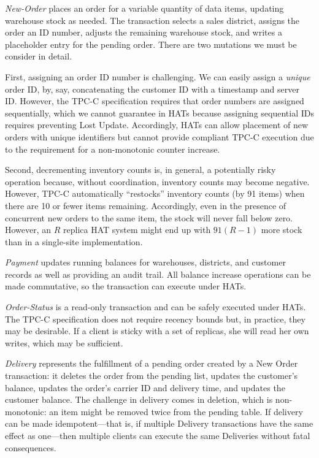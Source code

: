 \vspace{.5em}\noindent\textit{New-Order} places an order for a
variable quantity of data items, updating warehouse stock as
needed. The transaction selects a sales district, assigns the order an
ID number, adjusts the remaining warehouse stock, and writes a
placeholder entry for the pending order. There are two mutations we
must be consider in detail.

First, assigning an order ID number is challenging. We can easily
assign a \textit{unique} order ID, by, say, concatenating the customer
ID with a timestamp and server ID. However, the TPC-C specification
requires that order numbers are assigned sequentially, which we cannot
guarantee in HATs because assigning sequential IDs requires preventing
Lost Update. Accordingly, HATs can allow placement of new orders with
unique identifiers but cannot provide compliant TPC-C execution due to
the requirement for a non-monotonic counter increase.

Second, decrementing inventory counts is, in general, a potentially
risky operation because, without coordination, inventory counts may
become negative. However, TPC-C automatically ``restocks'' inventory
counts (by 91 items) when there are 10 or fewer items
remaining. Accordingly, even in the presence of concurrent new orders
to the same item, the stock will never fall below zero. However, an
$R$ replica HAT system might end up with $91(R-1)$ more stock than in
a single-site implementation.

\vspace{.5em}\noindent\textit{Payment} updates running balances for
warehouses, districts, and customer records as well as providing an
audit trail. All balance increase operations can be made commutative,
so the transaction can execute under HATs.

\vspace{.5em}\noindent\textit{Order-Status} is a read-only transaction
and can be safely executed under HATs. The TPC-C specification does
not require recency bounds but, in practice, they may be desirable. If
a client is sticky with a set of replicas, she will read her own
writes, which may be sufficient.

\vspace{.5em}\noindent\textit{Delivery} represents the fulfillment of
a pending order created by a New Order transaction: it deletes the
order from the pending list, updates the customer's balance, updates
the order's carrier ID and delivery time, and updates the customer
balance. The challenge in delivery comes in deletion, which is
non-monotonic: an item might be removed twice from the pending
table. If delivery can be made idempotent---that is, if multiple
Delivery transactions have the same effect as one---then multiple
clients can execute the same Deliveries without fatal consequences.

